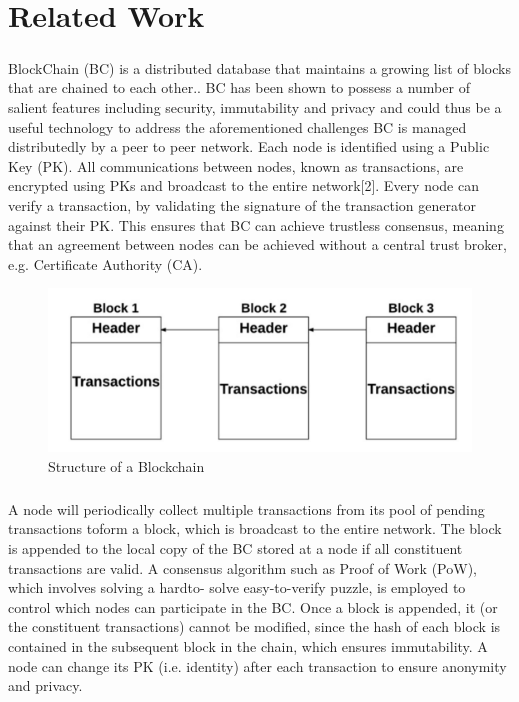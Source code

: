 \chapter{Related Work}
\paragraph{}BlockChain (BC) is a distributed database that maintains a
growing list of blocks that are chained to each other.. BC has been shown to possess a
number of salient features including security, immutability and
privacy and could thus be a useful technology to address the
aforementioned challenges BC is managed distributedly by a peer to peer
network. Each node is identified using a Public Key (PK). All
communications between nodes, known as transactions, are
encrypted using PKs and broadcast to the entire network[2]. Every
node can verify a transaction, by validating the signature of the
transaction generator against their PK. This ensures that BC
can achieve trustless consensus, meaning that an agreement
between nodes can be achieved without a central trust broker,
e.g. Certificate Authority (CA).

\begin{figure}[H]
	\centering
	\includegraphics[scale=0.3]{blockchain.png}
	\caption{Structure of a Blockchain}
\end{figure}

\paragraph{}A node will periodically collect
multiple transactions from its pool of pending transactions toform a block, which is broadcast to the entire network. The
block is appended to the local copy of the BC stored at a node
if all constituent transactions are valid. A consensus algorithm
such as Proof of Work (PoW), which involves solving a hardto-
solve easy-to-verify puzzle, is employed to control which
nodes can participate in the BC. Once a block is appended, it
(or the constituent transactions) cannot be modified, since the
hash of each block is contained in the subsequent block in the
chain, which ensures immutability. A node can change its PK
(i.e. identity) after each transaction to ensure anonymity and
privacy.
